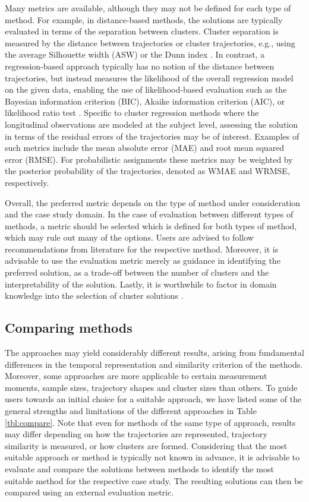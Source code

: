 Many metrics are available, although they may not be defined for each type of method. For example, in distance-based methods, the solutions are typically evaluated in terms of the separation between clusters. Cluster separation is measured by the distance between trajectories or cluster trajectories, e.g., using the average Silhouette width (ASW) \citep{rousseeuw1987silhouettes} or the Dunn index \citep{arbelaitz2013extensive}. In contrast, a regression-based approach typically has no notion of the distance between trajectories, but instead measures the likelihood of the overall regression model on the given data, enabling the use of likelihood-based evaluation such as the Bayesian information criterion (BIC), Akaike information criterion (AIC), or likelihood ratio test \citep{vandernest2020overview}. Specific to cluster regression methods where the longitudinal observations are modeled at the subject level, assessing the solution in terms of the residual errors of the trajectories may be of interest. Examples of such metrics include the mean absolute error (MAE) and root mean squared error (RMSE). For probabilistic assignments these metrics may be weighted by the posterior probability of the trajectories, denoted as WMAE and WRMSE, respectively.

Overall, the preferred metric depends on the type of method under consideration and the case study domain. In the case of evaluation between different types of methods, a metric should be selected which is defined for both types of method, which may rule out many of the options. Users are advised to follow recommendations from literature for the respective method. Moreover, it is advisable to use the evaluation metric merely as guidance in identifying the preferred solution, as a trade-off between the number of clusters and the interpretability of the solution. Lastly, it is worthwhile to factor in domain knowledge into the selection of cluster solutions \citep{nagin2018group}.

\subsection{Comparing methods}\label{methods-compare}

The approaches may yield considerably different results, arising from fundamental differences in the temporal representation and similarity criterion of the methods. Moreover, some approaches are more applicable to certain measurement moments, sample sizes, trajectory shapes and cluster sizes than others. To guide users towards an initial choice for a suitable approach, we have listed some of the general strengths and limitations of the different approaches in Table \ref{tbl:compare}. Note that even for methods of the same type of approach, results may differ depending on how the trajectories are represented, trajectory similarity is measured, or how clusters are formed. Considering that the most suitable approach or method is typically not known in advance, it is advisable to evaluate and compare the solutions between methods to identify the most suitable method for the respective case study. The resulting solutions can then be compared using an external evaluation metric.

